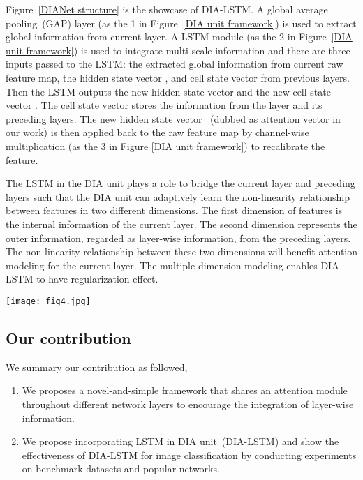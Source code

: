 \documentclass[letterpaper]{article} \usepackage{aaai20}  \usepackage{times}  \usepackage{helvet} \usepackage{courier}  \usepackage[hyphens]{url}  \usepackage{graphicx} \urlstyle{rm} \def\UrlFont{\rm}  \usepackage{graphicx}  \frenchspacing  \setlength{\pdfpagewidth}{8.5in}  \setlength{\pdfpageheight}{11in}  \usepackage{color}
\begin{document}
    Figure~\ref{DIANet structure} is the showcase of DIA-LSTM. A global average pooling~(GAP) layer (as the {\small{\textcircled{\tiny{1}}}} in Figure~\ref{DIA unit framework}) is used to extract global information from current layer. A LSTM module (as the {\small{\textcircled{\tiny{2}}}} in Figure~\ref{DIA unit framework}) is used to integrate multi-scale information and there are three inputs passed to the LSTM: the extracted global information from current raw feature map, the hidden state vector , and cell state vector  from previous layers. Then the LSTM outputs the new hidden state vector  and the new cell state vector . The cell state vector  stores the information from the  layer and its preceding layers. The new hidden state vector ~(dubbed as attention vector in our work) is then applied back to the raw feature map by channel-wise multiplication (as the {\small{\textcircled{\tiny{3}}}} in Figure \ref{DIA unit framework}) to recalibrate the feature. 
	
The LSTM in the DIA unit plays a role to bridge the current layer and preceding layers such that the DIA unit can adaptively learn the non-linearity relationship between features in two different dimensions. The first dimension of features is the internal information of the current layer. The second dimension represents the outer information, regarded as layer-wise information, from the preceding layers. The non-linearity relationship between these two dimensions will benefit attention modeling for the current layer. The multiple dimension modeling enables DIA-LSTM to have regularization effect.  
	\begin{figure*}[htbp]
		\centering
\texttt{[image: fig4.jpg]}
		\caption{The showcase of DIA-LSTM. In the LSTM cell,  is the cell state vector and  is the hidden state vector. GAP means global average pool over channels and  means channel-wise multiplication.}
		\label{DIANet structure}
	\end{figure*}
	\subsection{Our contribution}
	We summary our contribution as followed,
	\begin{enumerate}
	    \item We proposes a novel-and-simple framework that shares an attention module throughout different network layers to encourage the integration of layer-wise information.
	    \item We propose incorporating LSTM in DIA unit~(DIA-LSTM) and show the effectiveness of DIA-LSTM for image classification by conducting experiments on benchmark datasets and popular networks.
	\end{enumerate}
	
\end{document}
